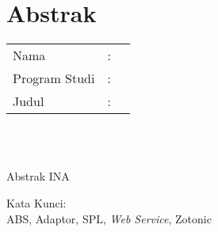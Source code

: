 %
%
%

\chapter*{Abstrak}

\vspace*{0.2cm}

\noindent \begin{tabular}{l l p{10cm}}
	Nama&: & \penulis \\
	Program Studi&: & \program \\
	Judul&: & \judul \\
\end{tabular} \\ 

\vspace*{0.5cm}

\noindent 
\\ Abstrak INA

\vspace*{0.2cm}

\noindent Kata Kunci: \\ 
\noindent ABS, Adaptor, SPL, \textit{Web Service}, Zotonic\\ 

\newpage
